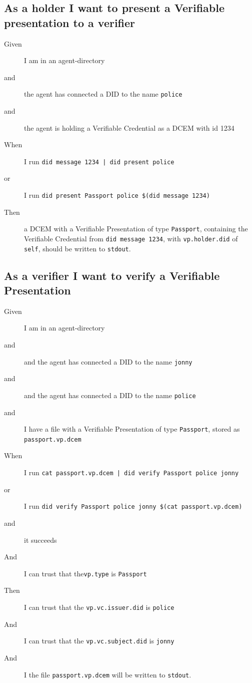 \subsection{As a holder I want to present a Verifiable presentation to a verifier}
\begin{description}
    \item[Given] I am in an agent-directory
    \item[and] the agent has connected a DID to the name \texttt{police}
    \item[and] the agent is holding a Verifiable Credential as a DCEM with id 1234
    \item[When] I run \texttt{did message 1234 | did present police}
    \item[or] I run \texttt{did present Passport police \$(did message 1234)}
    \item[Then] a DCEM with a Verifiable Presentation of type \texttt{Passport}, containing the Verifiable Credential from \texttt{did message 1234}, with \texttt{vp.holder.did} of \texttt{self}, should be written to \texttt{stdout}.
\end{description}



\subsection{As a verifier I want to verify a Verifiable Presentation}
\begin{description}
    \item[Given] I am in an agent-directory
    \item[and] and the agent has connected a DID to the name \texttt{jonny}
    \item[and] and the agent has connected a DID to the name \texttt{police}
    \item[and] I have a file with a Verifiable Presentation of type \texttt{Passport}, stored as \texttt{passport.vp.dcem}
    \item[When] I run \texttt{cat passport.vp.dcem | did verify Passport police jonny}
    \item[or] I run \texttt{did verify Passport police jonny \$(cat passport.vp.dcem)}
    \item[and] it succeeds
    \item[And] I can trust that the\texttt{vp.type} is \texttt{Passport}
    \item[Then] I can trust that the \texttt{vp.vc.issuer.did} is \texttt{police}
    \item[And] I can trust that the \texttt{vp.vc.subject.did} is \texttt{jonny}
    \item[And] I the file \texttt{passport.vp.dcem} will be written to \texttt{stdout}.
\end{description}



